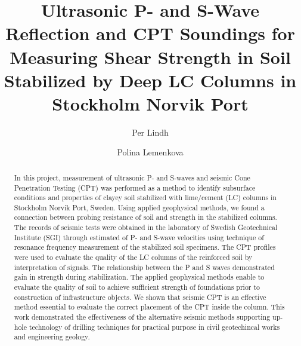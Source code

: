 \documentclass[final,3p,times,onecolumn,authoryear]{elsarticle}
\begin{document}
\begin{frontmatter}

\title{Ultrasonic P- and S-Wave Reflection and CPT Soundings for Measuring Shear Strength in Soil Stabilized by Deep LC Columns in Stockholm Norvik Port}

\author[label1,label2]{Per Lindh}


\author[label3]{Polina Lemenkova}

\begin{abstract} In this project, measurement of ultrasonic P- and S-waves and seismic Cone Penetration Testing (CPT) was performed as a method to identify subsurface conditions and properties of clayey soil stabilized with lime/cement (LC) columns in Stockholm Norvik Port, Sweden. Using applied geophysical methods, we found a connection between probing resistance of soil and strength in the stabilized columns. The records of  seismic tests were obtained in the laboratory of Swedish Geotechnical Institute (SGI) through estimated of P- and S-wave velocities using technique of resonance frequency measurement of the stabilized soil specimens. The CPT profiles were used to evaluate the quality of the LC columns of the reinforced soil by interpretation of signals. The relationship between the P and S waves demonstrated gain in strength during stabilization. The applied geophysical methods enable to evaluate the quality of soil to achieve sufficient strength of foundations prior to construction of infrastructure objects. We shown that seismic CPT is an effective method essential to evaluate the correct placement of the CPT inside the column. This work demonstrated the effectiveness of the alternative seismic methods supporting up-hole technology of drilling techniques for practical purpose in civil geotechincal works and engineering geology. \end{abstract}


\end{frontmatter}
\end{document}
